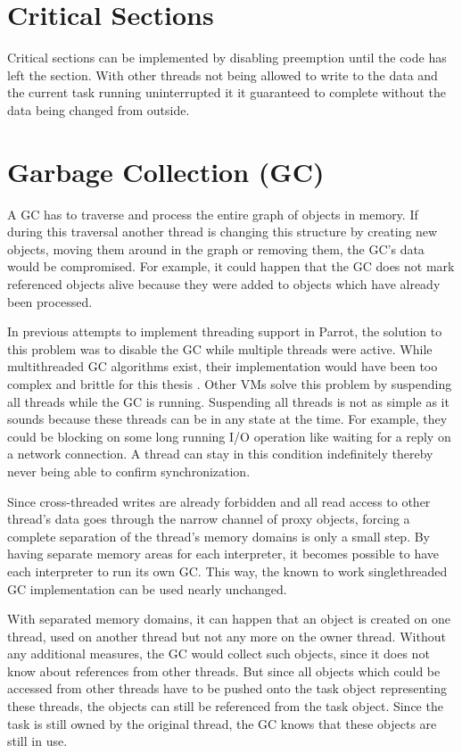 \documentclass[bachelor,english]{hgbthesis}
\begin{document}
\section{Critical Sections}

Critical sections can be implemented by disabling preemption until the code has left the section. With other threads not being allowed to write to the data and the current task running uninterrupted it it guaranteed to complete without the data being changed from outside.

\section{Garbage Collection (GC)}

A GC has to traverse and process the entire graph of objects in memory. If during this traversal another thread is changing this structure by creating new objects, moving them around in the graph or removing them, the GC's data would be compromised. For example, it could happen that the GC does not mark referenced objects alive because they were added to objects which have already been processed.

In previous attempts to implement threading support in Parrot, the solution to this problem was to disable the GC while multiple threads were active. While multithreaded GC algorithms exist, their implementation would have been too complex and brittle for this thesis \cite{VCGC}. Other VMs solve this problem by suspending all threads while the GC is running. Suspending all threads is not as simple as it sounds because these threads can be in any state at the time. For example, they could be blocking on some long running I/O operation like waiting for a reply on a network connection. A thread can stay in this condition indefinitely thereby never being able to confirm synchronization.

Since cross-threaded writes are already forbidden and all read access to other thread's data goes through the narrow channel of proxy objects, forcing a complete separation of the thread's memory domains is only a small step. By having separate memory areas for each interpreter, it becomes possible to have each interpreter to run its own GC. This way, the known to work singlethreaded GC implementation can be used nearly unchanged.

With separated memory domains, it can happen that an object is created on one thread, used on another thread but not any more on the owner thread. Without any additional measures, the GC would collect such objects, since it does not know about references from other threads. But since all objects which could be accessed from other threads have to be pushed onto the task object representing these threads, the objects can still be referenced from the task object. Since the task is still owned by the original thread, the GC knows that these objects are still in use.
\end{document}
